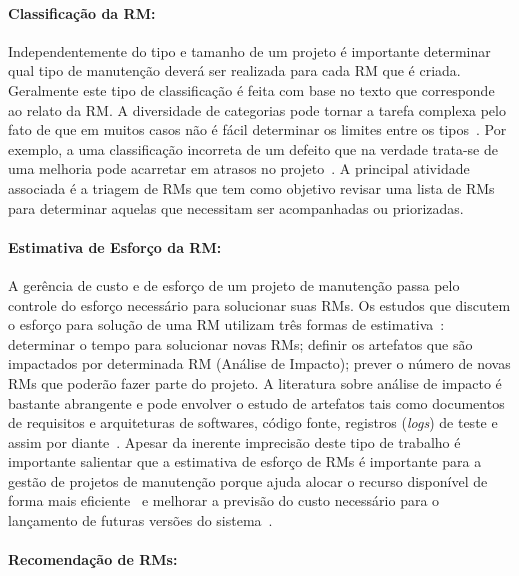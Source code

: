 \paragraph{Classificação da RM:}

Independentemente do tipo e tamanho de um projeto é importante determinar qual
tipo de manutenção deverá ser realizada para cada RM que é criada. Geralmente
este tipo de classificação é feita com base no texto que corresponde ao relato
da RM\@. A diversidade de categorias pode tornar a tarefa complexa pelo fato de
que em muitos casos não é fácil determinar os limites entre os
tipos~\cite{antoniol2008bug}. Por exemplo, a uma classificação incorreta de um
defeito que na verdade trata-se de uma melhoria pode acarretar em atrasos no
projeto~\cite{cavalcanti2014challenges}. A principal atividade associada é a
triagem de RMs que tem como objetivo revisar uma lista de RMs para determinar
aquelas que necessitam ser acompanhadas ou priorizadas.

\paragraph{Estimativa de Esforço da RM:}

A gerência de custo e de esforço de um projeto de manutenção passa pelo
controle do esforço necessário para solucionar suas RMs. Os estudos que
discutem o esforço para solução de uma RM utilizam três formas de
estimativa~\cite{cavalcanti2014challenges}: determinar o tempo para solucionar
novas RMs; definir os artefatos que são impactados por determinada RM (Análise
de Impacto); prever o número de novas RMs que poderão fazer parte do projeto. A
literatura sobre análise de impacto é bastante abrangente e pode envolver o
estudo de artefatos tais como documentos de requisitos e arquiteturas de
softwares, código fonte, registros (\textit{logs}) de teste e assim por
diante~\cite{cavalcanti2014challenges}. Apesar da inerente imprecisão deste
tipo de trabalho é importante salientar que a estimativa de esforço de RMs é
importante para a gestão de projetos de manutenção porque ajuda alocar o
recurso disponível de forma mais
eficiente~\cite{Bhattacharya:2011:BTP:1985441.1985472} e melhorar a previsão do
custo necessário para o lançamento de futuras versões do
sistema~\cite{Vijayakumar2014}.

\paragraph{Recomendação de RMs:}

